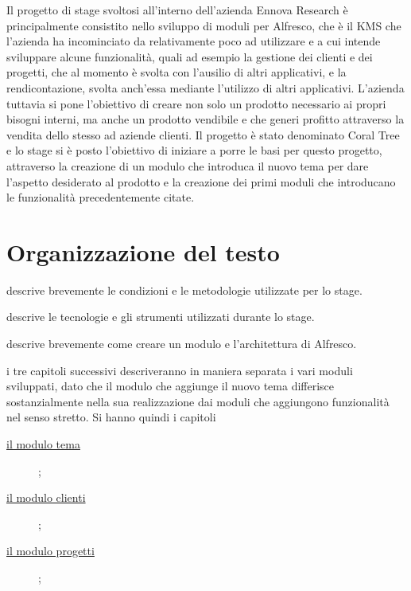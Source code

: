 Il progetto di stage svoltosi all’interno dell’azienda Ennova Research è principalmente consistito nello sviluppo di moduli per Alfresco, che è il \gls{KMS} che l'azienda ha incominciato da relativamente poco ad utilizzare e a cui intende sviluppare alcune funzionalità, quali ad esempio la gestione dei clienti e dei progetti, che al momento è svolta con l'ausilio di altri applicativi, e la rendicontazione, svolta anch'essa mediante l'utilizzo di altri applicativi.
L'azienda tuttavia si pone l'obiettivo di creare non solo un prodotto necessario ai propri bisogni interni, ma anche un prodotto vendibile e che generi profitto attraverso la vendita dello stesso ad aziende clienti. Il progetto è stato denominato Coral Tree e lo stage si è posto l'obiettivo di iniziare a porre le basi per questo progetto, attraverso la creazione di un modulo che introduca il nuovo tema per dare l'aspetto desiderato al prodotto e la creazione dei primi moduli che introducano le funzionalità precedentemente citate.

\section{Organizzazione del testo}
\begin{description}
    \item[{\hyperref[cap:descrizione-stage]{Il secondo capitolo}}] descrive brevemente le condizioni e le metodologie utilizzate per lo stage.
    \item[{\hyperref[cap:tecnologie-strumenti]{Il terzo capitolo}}] descrive le tecnologie e gli strumenti utilizzati durante lo stage.    
		 \item[{\hyperref[cap:architettura]{Il quarto  capitolo}}] descrive brevemente come creare un modulo e l'architettura di Alfresco.
		\item i tre capitoli successivi descriveranno in maniera separata i vari moduli sviluppati, dato che il modulo che aggiunge il nuovo tema differisce
		sostanzialmente nella sua realizzazione dai moduli che aggiungono funzionalità nel senso stretto.
		Si hanno quindi i capitoli
		\begin{description}
		\item[{\hyperref[cap:modulo-tema]{il modulo tema}}];
		\item[{\hyperref[cap:modulo-clienti]{il modulo clienti}}];
		\item[{\hyperref[cap:modulo-progetti]{ il modulo progetti}}];
		\end{description}
\end{description}